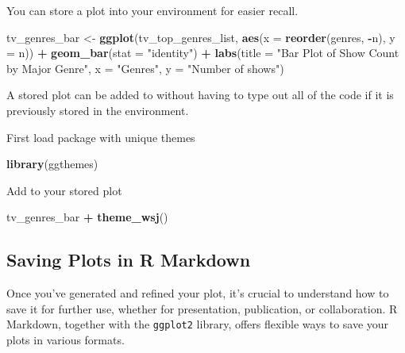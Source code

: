 \documentclass[
]{book}
\newenvironment{Shaded}{\begin{snugshade}}{\end{snugshade}}
\newcommand{\AttributeTok}[1]{\textcolor[rgb]{0.13,0.29,0.53}{#1}}
\newcommand{\FunctionTok}[1]{\textcolor[rgb]{0.13,0.29,0.53}{\textbf{#1}}}
\newcommand{\NormalTok}[1]{#1}
\newcommand{\OtherTok}[1]{\textcolor[rgb]{0.56,0.35,0.01}{#1}}
\newcommand{\SpecialCharTok}[1]{\textcolor[rgb]{0.81,0.36,0.00}{\textbf{#1}}}
\newcommand{\StringTok}[1]{\textcolor[rgb]{0.31,0.60,0.02}{#1}}
\begin{document}
You can store a plot into your environment for easier recall.

\begin{Shaded}
\begin{Highlighting}[]
\NormalTok{tv\_genres\_bar }\OtherTok{\textless{}{-}} \FunctionTok{ggplot}\NormalTok{(tv\_top\_genres\_list, }\FunctionTok{aes}\NormalTok{(}\AttributeTok{x =} \FunctionTok{reorder}\NormalTok{(genres, }\SpecialCharTok{{-}}\NormalTok{n), }\AttributeTok{y =}\NormalTok{ n)) }\SpecialCharTok{+}
  \FunctionTok{geom\_bar}\NormalTok{(}\AttributeTok{stat =} \StringTok{"identity"}\NormalTok{) }\SpecialCharTok{+}
  \FunctionTok{labs}\NormalTok{(}\AttributeTok{title =} \StringTok{"Bar Plot of Show Count by Major Genre"}\NormalTok{,}
       \AttributeTok{x =} \StringTok{"Genres"}\NormalTok{,}
       \AttributeTok{y =} \StringTok{"Number of shows"}\NormalTok{)}
\end{Highlighting}
\end{Shaded}

A stored plot can be added to without having to type out all of the code if it is previously stored in the environment.

First load package with unique themes

\begin{Shaded}
\begin{Highlighting}[]
\FunctionTok{library}\NormalTok{(ggthemes)}
\end{Highlighting}
\end{Shaded}

Add to your stored plot

\begin{Shaded}
\begin{Highlighting}[]
\NormalTok{tv\_genres\_bar }\SpecialCharTok{+}
  \FunctionTok{theme\_wsj}\NormalTok{()}
\end{Highlighting}
\end{Shaded}

\hypertarget{saving-plots-in-r-markdown}{%
\subsection*{Saving Plots in R Markdown}\label{saving-plots-in-r-markdown}}

Once you've generated and refined your plot, it's crucial to understand how to save it for further use, whether for presentation, publication, or collaboration. R Markdown, together with the \texttt{ggplot2} library, offers flexible ways to save your plots in various formats.
\end{document}
